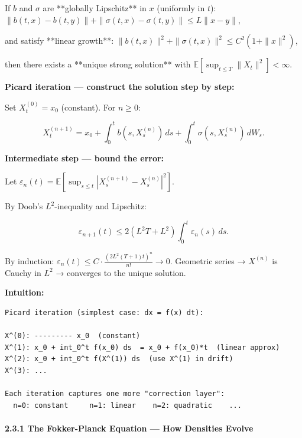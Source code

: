 \documentclass[11pt,a4paper]{article}
\begin{document}
\begin{tcolorbox}[colback=thmbg!60,colframe=optgold,fonttitle=\bfseries\sffamily,title={\textsf{\textbf{Theorem / Key Idea}} — Theorem — Strong Solution Existence (Picard–Lindelöf for SDEs)},breakable]
If $b$ and $\sigma$ are **globally Lipschitz** in $x$ (uniformly in $t$):
$\|b(t,x)-b(t,y)\| + \|\sigma(t,x)-\sigma(t,y)\| \le L\|x-y\|$,

and satisfy **linear growth**: $\|b(t,x)\|^2 + \|\sigma(t,x)\|^2 \le C^2(1+\|x\|^2)$,

then there exists a **unique strong solution** with $\mathbb{E}\!\left[\sup_{t\le T}\|X_t\|^2\right] < \infty$.
\end{tcolorbox}

\textbf{Picard iteration --- construct the solution step by step:}

Set \(X_t^{(0)} = x_0\) (constant). For \(n\ge 0\):

\[X_t^{(n+1)} = x_0 + \int_0^t b(s, X_s^{(n)})\,ds + \int_0^t \sigma(s, X_s^{(n)})\,dW_s.\]

\textbf{Intermediate step --- bound the error:}

Let \(\varepsilon_n(t) = \mathbb{E}\!\left[\sup_{s\le t}|X_s^{(n+1)}-X_s^{(n)}|^2\right]\).

By Doob's \(L^2\)-inequality and Lipschitz:

\[\varepsilon_{n+1}(t) \le 2(L^2 T + L^2)\int_0^t \varepsilon_n(s)\,ds.\]

By induction: \(\varepsilon_n(t) \le C \cdot \frac{(2L^2(T+1)t)^n}{n!} \to 0\). Geometric series → \(X^{(n)}\) is Cauchy in \(L^2\) → converges to the unique solution.

\textbf{Intuition:}

\begin{verbatim}
Picard iteration (simplest case: dx = f(x) dt):

X^(0): --------- x_0  (constant)
X^(1): x_0 + int_0^t f(x_0) ds  = x_0 + f(x_0)*t  (linear approx)
X^(2): x_0 + int_0^t f(X^(1)) ds  (use X^(1) in drift)
X^(3): ...
        
Each iteration captures one more "correction layer":
  n=0: constant     n=1: linear    n=2: quadratic    ...
\end{verbatim}

\paragraph{2.3.1 The Fokker-Planck Equation --- How Densities Evolve}\label{the-fokker-planck-equation-how-densities-evolve}
\end{document}
